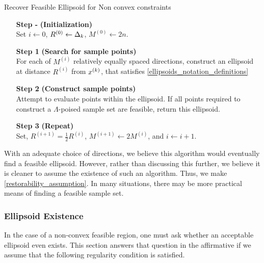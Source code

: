\begin{algorithm}[H]
    \caption{Recover Feasible Ellipsoid for Non convex constraints}	
    \label{general_recover}
    \begin{itemize}
        \item[\textbf{Step -}] \textbf{(Initialization)} \\
        		Set $i\gets0$, $R^{(0)} \gets \Delta_k$, $M^{(0)} \gets 2n$.
        		
        \item[\textbf{Step 1}] \textbf{(Search for sample points)} \\
        	For each of $M^{(i)}$ relatively equally spaced directions,
        	construct an ellipsoid at distance $R^{(i)}$ from $x^{(k)}$, that satisfies \cref{ellipsoids_notation_definitions}
        	
        \item[\textbf{Step 2}] \textbf{(Construct sample points)} \\
        	Attempt to evaluate points within the ellipsoid.
        	If all points required to construct a $\Lambda$-poised sample set are feasible, return this ellipsoid.
        \item[\textbf{Step 3}] \textbf{(Repeat)} \\
        	Set, $R^{(i+1)} = \frac 1 2 R^{(i)}$, $M^{(i+1)} \gets 2 M^{(i)}$, and $i \gets i + 1$.
    \end{itemize}
\end{algorithm}

With an adequate choice of directions, we believe this algorithm would eventually find a feasible ellipsoid.
However, rather than discussing this further, we believe it is cleaner to assume the existence of such an algorithm.
Thus, we make \cref{restorability_assumption}.
In many situations, there may be more practical means of finding a feasible sample set.

\subsubsection{Ellipsoid Existence}

In the case of a non-convex feasible region, one must ask whether an acceptable ellipsoid even exists.
This section answers that question in the affirmative if we assume that the following regularity condition is satisfied.


